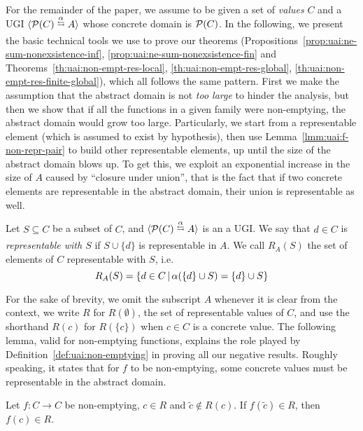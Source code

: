 For the remainder of the paper, we assume to be given a set of \emph{values} $C$ and a UGI $\ugi{\pow(C)}{\alpha}{A}$ whose concrete domain is $\mathcal{P}(C)$.
In the following, we present the basic technical tools we use to prove our theorems (Propositions~\ref{prop:uai:ne-sum-nonexsistence-inf}, \ref{prop:uai:ne-sum-nonexsistence-fin} and Theorems~\ref{th:uai:non-empt-res-local}, \ref{th:uai:non-empt-res-global}, \ref{th:uai:non-empt-res-finite-global}), which all follows the same pattern. First we make the assumption that the abstract domain is not \emph{too large} to hinder the analysis, but then we show that if all the functions in a given family were non-emptying, the abstract domain would grow too large.
Particularly, we start from a representable element (which is assumed to exist by hypothesis), then use Lemma~\ref{lmm:uai:f-non-repr-pair} to build other representable elements, up until the size of the abstract domain blows up. To get this, we exploit an exponential increase in the size of $A$ caused by ``closure under union'', that is the fact that if two concrete elements are representable in the abstract domain, their union is representable as well.

\begin{definition}\label{def:uai:repr-with-set}
	Let $S \subseteq C$ be a subset of $C$, and $\ugi{\pow(C)}{\alpha}{A}$ is an a UGI. We say that $d \in C$ is \emph{representable with $S$} if $S \cup \{ d \}$ is representable in $A$. We call $R_A(S)$ the set of elements of $C$ representable with $S$, i.e.
	\[
	R_A(S) = \{ d \in C \,\vert\, \alpha(\{ d \} \cup S) = \{ d \} \cup S \}
	\]
\end{definition}

For the sake of brevity, we omit the subscript $A$ whenever it is clear from the context, we write $R$ for $R(\emptyset)$, the set of representable values of $C$, and use the shorthand $R(c)$ for $R(\{ c \})$ when $c \in C$ is a concrete value.
The following lemma, valid for non-emptying functions, explains the role played by Definition~\ref{def:uai:non-emptying} in proving all our negative results. Roughly speaking, it states that for $f$ to be non-emptying, some concrete values must be representable in the abstract domain.

\begin{lemma}\label{lmm:uai:f-non-repr-pair}
	Let $f: C \rightarrow C$ be non-emptying, $c \in R$ and $\tilde{c} \notin R(c)$. If $f(\tilde{c})\in R$, then $f(c) \in R$.
\end{lemma}

